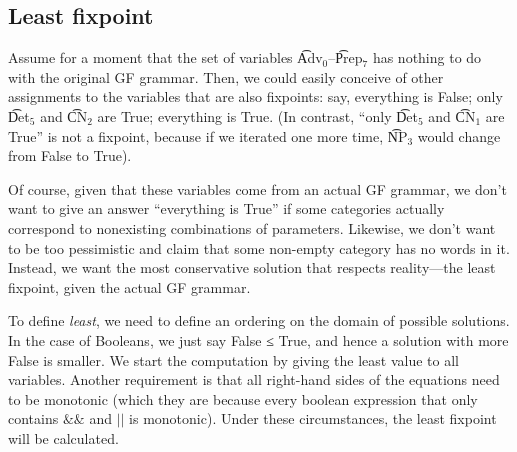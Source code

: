 \begin{EmptyItem}
\begin{HighlightingFancy}[]
\OtherTok{::=} \FunctionTok{&&} \FunctionTok{||} \FunctionTok{&&}  \NormalTok{;}
\OtherTok{::=} \FunctionTok{&&} \FunctionTok{||}  \NormalTok{;}
\OtherTok{::=} \FunctionTok{&&}  \NormalTok{;}
\OtherTok{::=} \FunctionTok{&&}  \NormalTok{;}
\OtherTok{::=} \FunctionTok{&&}  \NormalTok{;}
\OtherTok{::=}  \NormalTok{;}
\OtherTok{::=}  \NormalTok{;}
\OtherTok{::=}  \NormalTok{;}
\end{HighlightingFancy}
\end{EmptyItem}

\subsection{Least fixpoint}


Assume for a moment that the set of variables  \t{Adv$_\text{0}$}--\t{Prep$_\text{7}$} has nothing to do with the original GF grammar. Then, we could easily conceive of other assignments to the variables that are also fixpoints: say, everything is False; only \t{Det$_\text{5}$} and \t{CN$_\text{2}$} are True; everything is True. (In contrast, “only \t{Det$_\text{5}$} and \t{CN$_\text{1}$} are True” is not a fixpoint, because if we iterated one more time, \t{NP$_\text{3}$} would change from False to True).

Of course, given that these variables come from an actual GF grammar, we don’t want to give an answer “everything is True” if some categories actually correspond to nonexisting combinations of parameters. Likewise, we don’t want to be too pessimistic and claim that some non-empty category has no words in it. Instead, we want the most conservative solution that respects reality---the least fixpoint, given the actual GF grammar.

To define \emph{least}, we need to define an ordering on the domain of possible solutions. In the case of Booleans, we just say False ≤ True, and hence a solution with more False is smaller. 
We start the computation by giving the least value to all variables.
Another requirement is that all right-hand sides of the equations need to be monotonic (which they are because every boolean expression that only contains $\&\&$ and $||$ is monotonic). Under these circumstances, the least fixpoint will be calculated.

